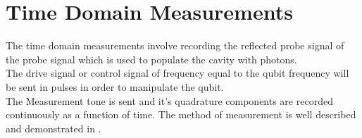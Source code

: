 
\chapter{Time Domain Measurements} %

\label{AppendixB} %

The time domain measurements involve recording the reflected probe signal of the probe signal which is used to populate the cavity with photons.\\The drive signal or control signal of frequency equal to the qubit frequency will be sent in pulses in order to manipulate the qubit.\\The Measurement tone is sent and it's quadrature components are recorded continuously as a function of time. The method of measurement is well described and demonstrated in \cite{Bianchetti2009}.


